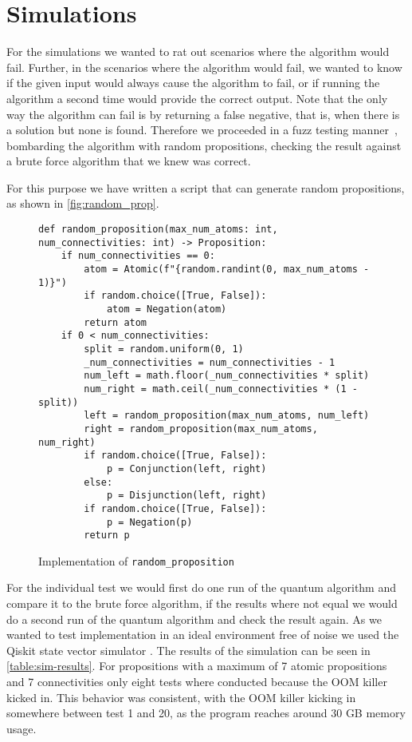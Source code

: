 \section{Simulations}\label{sec:simulations}

For the simulations we wanted to rat out scenarios where the algorithm would fail.
Further, in the scenarios where the algorithm would fail, we wanted to know if the given input would always cause the algorithm to fail, or if running the algorithm a second time would provide the correct output.
Note that the only way the algorithm can fail is by returning a false negative, that is, when there is a solution but none is found.
Therefore we proceeded in a fuzz testing manner~\cite{miller1990empirical}, bombarding the algorithm with random propositions, checking the result against a brute force algorithm that we knew was correct.

For this purpose we have written a script that can generate random propositions, as shown in \autoref{fig:random_prop}.

\begin{figure}[H]
\centering
\begin{verbatim}
def random_proposition(max_num_atoms: int, num_connectivities: int) -> Proposition:
    if num_connectivities == 0:
        atom = Atomic(f"{random.randint(0, max_num_atoms - 1)}")
        if random.choice([True, False]):
            atom = Negation(atom)
        return atom
    if 0 < num_connectivities:
        split = random.uniform(0, 1)
        _num_connectivities = num_connectivities - 1
        num_left = math.floor(_num_connectivities * split)
        num_right = math.ceil(_num_connectivities * (1 - split))
        left = random_proposition(max_num_atoms, num_left)
        right = random_proposition(max_num_atoms, num_right)
        if random.choice([True, False]):
            p = Conjunction(left, right)
        else:
            p = Disjunction(left, right)
        if random.choice([True, False]):
            p = Negation(p)
        return p
\end{verbatim}
\caption{Implementation of \texttt{random\_proposition} }
\label{fig:random_prop}
\end{figure}

For the individual test we would first do one run of the quantum algorithm and compare it to the brute force algorithm, if the results where not equal we would do a second run of the quantum algorithm and check the result again.
As we wanted to test implementation in an ideal environment free of noise we used the Qiskit state vector simulator \cite{Statevec72:online}.
The results of the simulation can be seen in \autoref{table:sim-results}.
For propositions with a maximum of 7 atomic propositions and 7 connectivities only eight tests where conducted because the OOM killer kicked in.
This behavior was consistent, with the OOM killer kicking in somewhere between test 1 and 20, as the program reaches around 30 GB memory usage.

